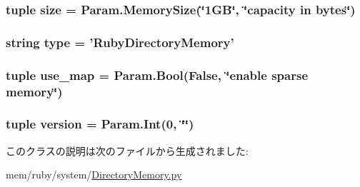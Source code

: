 \label{classDirectoryMemory_1_1RubyDirectoryMemory_aed055aaae53c2a47a1cfb9df844edf0a}
\hypertarget{classDirectoryMemory_1_1RubyDirectoryMemory_a377e5da8df1f89c5468c8b8cd07eac89}{
\subsubsection[{size}]{\setlength{\rightskip}{0pt plus 5cm}tuple {\bf size} = Param.MemorySize(\char`\"{}1GB\char`\"{}, \char`\"{}capacity in bytes\char`\"{})}}
\label{classDirectoryMemory_1_1RubyDirectoryMemory_a377e5da8df1f89c5468c8b8cd07eac89}
\hypertarget{classDirectoryMemory_1_1RubyDirectoryMemory_acce15679d830831b0bbe8ebc2a60b2ca}{
\subsubsection[{type}]{\setlength{\rightskip}{0pt plus 5cm}string {\bf type} = '{\bf RubyDirectoryMemory}'}}
\label{classDirectoryMemory_1_1RubyDirectoryMemory_acce15679d830831b0bbe8ebc2a60b2ca}
\hypertarget{classDirectoryMemory_1_1RubyDirectoryMemory_a70924397f00d2b3ada9c275ee02937ed}{
\subsubsection[{use\_\-map}]{\setlength{\rightskip}{0pt plus 5cm}tuple {\bf use\_\-map} = Param.Bool(False, \char`\"{}enable sparse memory\char`\"{})}}
\label{classDirectoryMemory_1_1RubyDirectoryMemory_a70924397f00d2b3ada9c275ee02937ed}
\hypertarget{classDirectoryMemory_1_1RubyDirectoryMemory_a76aa01cd80eeb03b381ebe36f17c16b2}{
\subsubsection[{version}]{\setlength{\rightskip}{0pt plus 5cm}tuple {\bf version} = Param.Int(0, \char`\"{}\char`\"{})}}
\label{classDirectoryMemory_1_1RubyDirectoryMemory_a76aa01cd80eeb03b381ebe36f17c16b2}


このクラスの説明は次のファイルから生成されました:\begin{DoxyCompactItemize}
\item 
mem/ruby/system/\hyperlink{DirectoryMemory_8py}{DirectoryMemory.py}\end{DoxyCompactItemize}
